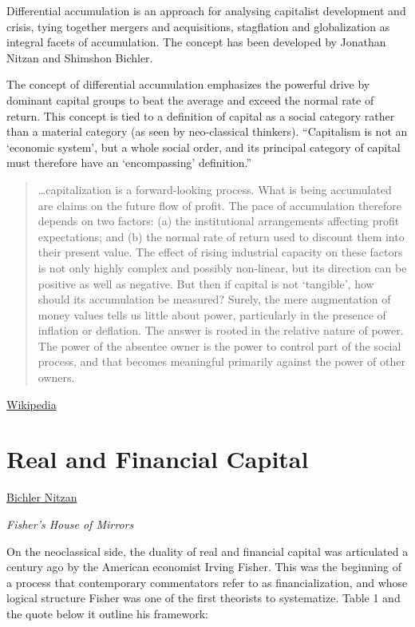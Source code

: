 \documentclass[
]{book}
\begin{document}
Differential accumulation is an approach for analysing capitalist development and crisis, tying together mergers and acquisitions, stagflation and globalization as integral facets of accumulation. The concept has been developed by Jonathan Nitzan and Shimshon Bichler.

The concept of differential accumulation emphasizes the powerful drive by dominant capital groups to beat the average and exceed the normal rate of return. This concept is tied to a definition of capital as a social category rather than a material category (as seen by neo-classical thinkers). ``Capitalism is not an `economic system', but a whole social order, and its principal category of capital must therefore have an `encompassing' definition.''

\begin{quote}
\ldots capitalization is a forward-looking process. What is being accumulated are claims on the future flow of profit. The pace of accumulation therefore depends on two factors: (a) the institutional arrangements affecting profit expectations; and (b) the normal rate of return used to discount them into their present value. The effect of rising industrial capacity on these factors is not only highly complex and possibly non-linear, but its direction can be positive as well as negative. But then if capital is not `tangible', how should its accumulation be measured? Surely, the mere augmentation of money values tells us little about power, particularly in the presence of inflation or deflation. The answer is rooted in the relative nature of power. The power of the absentee owner is the power to control part of the social process, and that becomes meaningful primarily against the power of other owners.
\end{quote}

\href{https://en.wikipedia.org/wiki/Differential_accumulation}{Wikipedia}

\hypertarget{real-and-financial-capital}{%
\section{Real and Financial Capital}\label{real-and-financial-capital}}

\href{https://evonomics.com/what-do-economists-mean-when-they-talk-about-capital-accumulation/}{Bichler Nitzan}

\emph{Fisher's House of Mirrors}

On the neoclassical side, the duality of real and financial capital was articulated a century ago by the American economist Irving Fisher. This was the beginning of a process that contemporary commentators refer to as financialization, and whose logical structure Fisher was one of the first theorists to systematize. Table 1 and the quote below it outline his framework:
\end{document}
